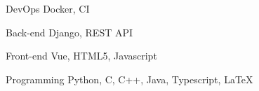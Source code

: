 

\begin{cvskills}

  \cvskill
    {DevOps} %
    {Docker, CI} %

  \cvskill
    {Back-end} %
    {Django, REST API} %

  \cvskill
    {Front-end} %
    {Vue, HTML5, Javascript} %

  \cvskill
    {Programming} %
    {Python, C, C++, Java, Typescript, LaTeX} %

\end{cvskills}
